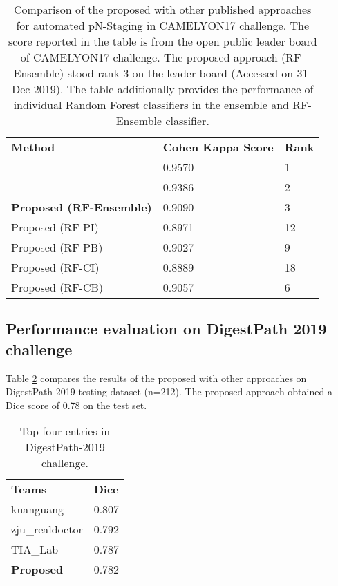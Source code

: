 \documentclass[times,twocolumn,final,authoryear]{tmp}
\begin{document}
\begin{table}
\centering
\caption{Comparison of the proposed with other published approaches for automated pN-Staging in CAMELYON17 challenge. The score reported in the table is from the open public leader board of CAMELYON17 challenge. The proposed approach (RF-Ensemble) stood rank-3 on the leader-board  (Accessed on 31-Dec-2019). The table additionally provides the performance of individual Random Forest classifiers in the ensemble and RF-Ensemble classifier.}
\label{path_tab:cm17-pnstage}
\begin{tabular}{@{}lll@{}}
  
\textbf{Method}                            & \textbf{Cohen Kappa Score} & \textbf{Rank} \\    
\citep{leeautomatic}       & 0.9570                     & 1             \\
\citep{pinchaudcamelyon17} & 0.9386                     & 2             \\
\textbf{Proposed (RF-Ensemble)}                         & 0.9090                     & 3             \\
Proposed (RF-PI)                               & 0.8971                     & 12            \\
Proposed (RF-PB)                               & 0.9027                     & 9             \\
Proposed (RF-CI)                               & 0.8889                     & 18            \\
Proposed (RF-CB)                               & 0.9057                     & 6             \\  
\end{tabular}\end{table}


\subsection{Performance evaluation on DigestPath 2019 challenge}
Table \ref{path_tab:digestpath_scores} compares the results of the proposed with other approaches on DigestPath-2019 testing dataset (n=212). The proposed approach obtained a Dice score of 0.78 on the test set.

\begin{table}
\centering
\caption{Top four entries in DigestPath-2019 challenge.}
\begin{tabular}{@{}ll@{}}
  
\textbf{Teams}          & \textbf{Dice}  \\    
kuanguang       & 0.807 \\ 
zju\_realdoctor & 0.792 \\ 
TIA\_Lab        & 0.787 \\ 
\textbf{Proposed}  & 0.782 \\  
\end{tabular}

\label{path_tab:digestpath_scores}
\end{table}
\end{document}
